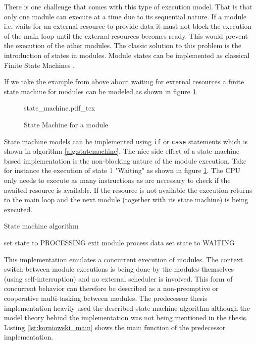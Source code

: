 There is one challenge that comes with this type of execution model. That is that only one module can execute at a time due to its sequential nature. If a module i.e. waits for an external resource to provide data it must not block the execution of the main loop until the external resources becomes ready. This would prevent the execution of the other modules. The classic solution to this problem is the introduction of states in modules. Module states can be implemented as classical Finite State Machines \cite{booth}.

If we take the example from above about waiting for external resources a finite state machine for modules can be modeled as shown in figure \ref{fig:statemachine}.

\begin{figure}[H]
\centering
{state_machine.pdf_tex}
\caption{State Machine for a module}
\label{fig:statemachine}
\end{figure}

State machine models can be implemented using \texttt{if} or \texttt{case} statements which is shown in algorithm \ref{alg:statemachine}. The nice side effect of a state machine based implementation is the non-blocking nature of the module execution. Take for instance the execution of state 1 "Waiting" as shown in figure \ref{fig:statemachine}. The CPU only needs to execute as many instructions as are necessary to check if the awaited resource is available. If the resource is not available the execution returns to the main loop and the next module (together with its state machine) is being executed.

\begin{algorithm}[H]
\caption{State machine algorithm}
\label{alg:statemachine}
\begin{algorithmic}
        \STATE set state to PROCESSING
    \ELSE
        \STATE exit module
    \ENDIF
{}
    \STATE process data
    \STATE set state to WAITING
\ENDIF
\end{algorithmic}
\end{algorithm}

This implementation emulates a concurrent execution of modules. The context switch between module executions is being done by the modules themselves (using self-interruption) and no external scheduler is involved. This form of concurrent behavior can therefore be described as a non-preemptive or cooperative multi-tasking between modules. The predecessor thesis \cite{korniowski} implementation heavily used the described state machine algorithm although the model theory behind the implementation was not being mentioned in the thesis. Listing \ref{lst:korniowski_main} shows the main function of the predecessor implementation.

